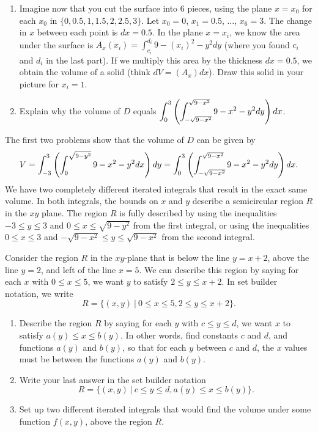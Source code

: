 \begin{problem}
\begin{enumerate}
 \item Imagine now that you cut the surface into 6 pieces, using the plane $x=x_0$ for each $x_0$ in $\{0,0.5,1,1.5,2, 2.5,3\}$. Let $x_0=0$, $x_1=0.5$, $\ldots$, $x_{6}=3$. The change in $x$ between each point is $dx=0.5$. 
 In the plane $x=x_i$, we know the area under the surface is $A_x(x_i) = \int_{c_i}^{d_i} 9-(x_i)^2-y^2 dy$ (where you found $c_i$  and $d_i$ in the last part).  If we multiply this area by the thickness $dx=0.5$, we obtain the volume of a solid (think $dV=(A_x)dx$).  Draw this solid in your picture for $x_i = 1$. 
\item Explain why the volume of $D$ equals $\displaystyle\int_{0}^{3} \left(\int_{-\sqrt{9-x^2}}^{\sqrt{9-x^2}}9-x^2-y^2 dy\right) dx$.
\end{enumerate}
\end{problem}

The first two problems show that the volume of $D$ can be given by 
$$V=\displaystyle\int_{-3}^{3} \left(\int_0^{\sqrt{9-y^2}}9-x^2-y^2 dx\right) dy = \displaystyle\int_{0}^{3} \left(\int_{-\sqrt{9-x^2}}^{\sqrt{9-x^2}}9-x^2-y^2 dy\right) dx.$$
We have two completely different iterated integrals that result in the exact same volume. In both integrals, the bounds on $x$ and $y$ describe a semicircular region $R$ in the $xy$ plane. The region $R$ is fully described by using the inequalities $-3\leq y\leq 3$ and $0\leq x\leq \sqrt{9-y^2}$ from the first integral, or using the inequalities $0\leq x\leq 3$ and $-\sqrt{9-x^2}\leq y\leq \sqrt{9-x^2}$ from the second integral.

\begin{problem}
 Consider the region $R$ in the $xy$-plane that is below the line $y=x+2$, above the line $y=2$, and left of the line $x=5$. We can describe this region by saying for each $x$ with $0\leq x\leq 5$, we want $y$ to satisfy $2\leq y\leq x+2$. In set builder notation, we write
$$R=\{(x,y)\ | \ 0\leq x\leq 5, 2\leq y\leq x+2\}.$$
\begin{enumerate}
 \item Describe the region $R$ by saying for each $y$ with $c\leq y\leq d$, we want $x$ to satisfy $a(y)\leq x\leq b(y)$. In other words, find constants $c$ and $d$, and functions $a(y)$ and $b(y)$, so that for each $y$ between $c$ and $d$, the $x$ values must be between the functions $a(y)$ and $b(y)$.
 \item Write your last answer in the set builder notation
$$R=\{(x,y)\ | \ c\leq y\leq d, a(y)\leq x\leq b(y)\}.$$
 \item Set up two different iterated integrals that would find the volume under some function $f(x,y)$, above the region $R$. 
\end{enumerate}
\end{problem}

